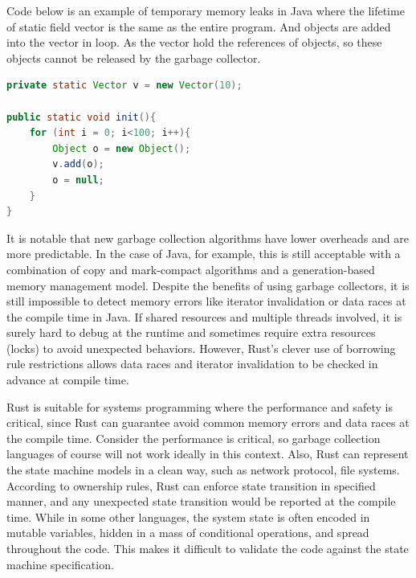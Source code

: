 \documentclass[10pt,a4paper,twocolumn]{article}
\begin{document}
Code below is an example of temporary memory leaks in Java where the lifetime of static field vector is the same as the entire program. And objects are added into the vector in loop. As the vector hold the references of objects, so these objects cannot be released by the garbage collector.
\begin{lstlisting}[language=Java, style=boxed, caption={Memory Leaks in Java}]
private static Vector v = new Vector(10);

public static void init(){
    for (int i = 0; i<100; i++){
        Object o = new Object();
        v.add(o);
        o = null;
    }
}
\end{lstlisting}

It is notable that new garbage collection algorithms have lower overheads and are more predictable. In the case of Java, for example, this is still acceptable with a combination of copy and mark-compact algorithms and a generation-based memory management model. Despite the benefits of using garbage collectors, it is still impossible to detect memory errors like iterator invalidation or data races at the compile time in Java. If shared resources and multiple threads involved, it is surely hard to debug at the runtime and sometimes require extra resources (locks) to avoid unexpected behaviors. However, Rust's clever use of borrowing rule restrictions allows data races and iterator invalidation to be checked in advance at compile time.


Rust is suitable for systems programming where the performance and safety is critical, since Rust can guarantee avoid common memory errors and data races at the compile time. Consider the performance is critical, so garbage collection languages of course will not work ideally in this context. Also, Rust can represent the state machine models in a clean way, such as network protocol, file systems. According to ownership rules, Rust can enforce state transition in specified manner, and any unexpected state transition would be reported at the compile time. While in some other languages, the system state is often encoded in mutable variables, hidden in a mass of conditional operations, and spread throughout the code. This makes it difficult to validate the code against the state machine specification. 
\end{document}
